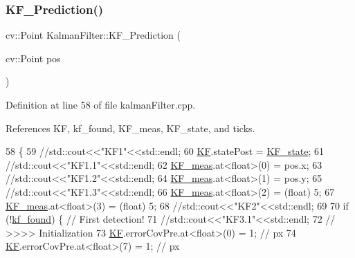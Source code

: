 \subsubsection{\texorpdfstring{K\+F\+\_\+\+Prediction()}{KF\_Prediction()}}
{\footnotesize\ttfamily cv\+::\+Point Kalman\+Filter\+::\+K\+F\+\_\+\+Prediction (\begin{DoxyParamCaption}\item[{cv\+::\+Point}]{pos }\end{DoxyParamCaption})}



Definition at line 58 of file kalman\+Filter.\+cpp.



References KF, kf\+\_\+found, K\+F\+\_\+meas, K\+F\+\_\+state, and ticks.


\begin{DoxyCode}
58                                                \{
59     \textcolor{comment}{//std::cout<<"KF1"<<std::endl;}
60     \hyperlink{class_kalman_filter_a486d5802080222974f49454c59b71d83}{KF}.statePost = \hyperlink{class_kalman_filter_a279304db3b9574783b2724ab2ed989af}{KF\_state};
61     \textcolor{comment}{//std::cout<<"KF1.1"<<std::endl;}
62     \hyperlink{class_kalman_filter_ab8ea794012f17385fead830634b1c1ed}{KF\_meas}.at<\textcolor{keywordtype}{float}>(0) = pos.x;
63     \textcolor{comment}{//std::cout<<"KF1.2"<<std::endl;}
64     \hyperlink{class_kalman_filter_ab8ea794012f17385fead830634b1c1ed}{KF\_meas}.at<\textcolor{keywordtype}{float}>(1) = pos.y;
65     \textcolor{comment}{//std::cout<<"KF1.3"<<std::endl;}
66     \hyperlink{class_kalman_filter_ab8ea794012f17385fead830634b1c1ed}{KF\_meas}.at<\textcolor{keywordtype}{float}>(2) = (\textcolor{keywordtype}{float}) 5;
67     \hyperlink{class_kalman_filter_ab8ea794012f17385fead830634b1c1ed}{KF\_meas}.at<\textcolor{keywordtype}{float}>(3) = (\textcolor{keywordtype}{float}) 5;
68     \textcolor{comment}{//std::cout<<"KF2"<<std::endl;}
69 
70     \textcolor{keywordflow}{if} (!\hyperlink{class_kalman_filter_a85ee09dd912c76ebcdbfa204153e28c1}{kf\_found}) \{ \textcolor{comment}{// First detection!}
71         \textcolor{comment}{//std::cout<<"KF3.1"<<std::endl;}
72         \textcolor{comment}{// >>>> Initialization}
73         \hyperlink{class_kalman_filter_a486d5802080222974f49454c59b71d83}{KF}.errorCovPre.at<\textcolor{keywordtype}{float}>(0) = 1; \textcolor{comment}{// px}
74         \hyperlink{class_kalman_filter_a486d5802080222974f49454c59b71d83}{KF}.errorCovPre.at<\textcolor{keywordtype}{float}>(7) = 1; \textcolor{comment}{// px}

\end{DoxyCode}
